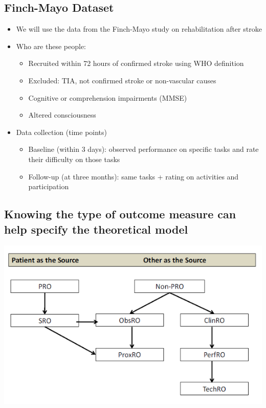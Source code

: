 \documentclass[
]{book}
\providecommand{\tightlist}{%
  \setlength{\itemsep}{0pt}\setlength{\parskip}{0pt}}
\begin{document}
\hypertarget{finch-mayo-dataset}{%
\subsection{Finch-Mayo Dataset}\label{finch-mayo-dataset}}

\begin{itemize}
\tightlist
\item
  We will use the data from the Finch-Mayo study on rehabilitation after stroke
\item
  Who are these people:

  \begin{itemize}
  \tightlist
  \item
    Recruited within 72 hours of confirmed stroke using WHO definition
  \item
    Excluded: TIA, not confirmed stroke or non-vascular causes
  \item
    Cognitive or comprehension impairments (MMSE)
  \item
    Altered consciousness
  \end{itemize}
\item
  Data collection (time points)

  \begin{itemize}
  \tightlist
  \item
    Baseline (within 3 days): observed performance on specific tasks and rate their difficulty on those tasks
  \item
    Follow-up (at three months): same tasks + rating on activities and participation
  \end{itemize}
\end{itemize}

\hypertarget{knowing-the-type-of-outcome-measure-can-help-specify-the-theoretical-model}{%
\subsection{Knowing the type of outcome measure can help specify the theoretical model}\label{knowing-the-type-of-outcome-measure-can-help-specify-the-theoretical-model}}

\includegraphics[width=0.5\linewidth]{./12_7}
\end{document}
